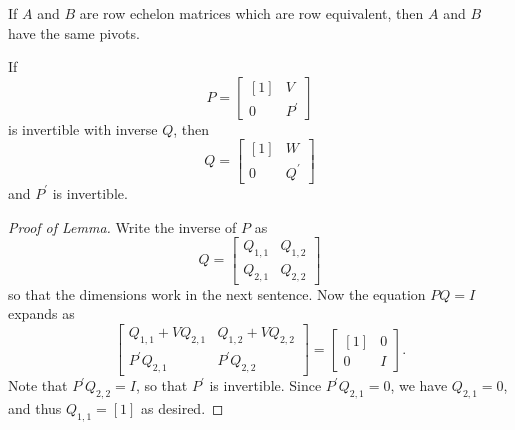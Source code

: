 \documentclass{memoir}
\begin{document}
\setcounter{section}{10}
\setcounter{dfn}{5}

\begin{prp}
If $A$ and $B$ are row echelon matrices which are row equivalent, then $A$ and $B$ have the same pivots.
\end{prp}

\begin{lem}
If \[ P = \left[ \begin{array}{c|c} [1] & V \\ \hline 0 & P^\prime \end{array} \right] \] is invertible with inverse $Q$, then \[Q = \left[ \begin{array}{c|c} [1] & W \\ \hline 0 & Q^\prime \end{array} \right] \] and $P^\prime$ is invertible.
\end{lem}

\begin{proof}[Proof of Lemma]
Write the inverse of $P$ as \[ Q = \left[ \begin{array}{c|c} Q_{1,1} & Q_{1,2} \\ \hline Q_{2,1} & Q_{2,2} \end{array} \right] \] so that the dimensions work in the next sentence. Now the equation $PQ = I$ expands as \[ \left[ \begin{array}{c|c} Q_{1,1} + VQ_{2,1} & Q_{1,2} + VQ_{2,2} \\ \hline P^\prime Q_{2,1} & P^\prime Q_{2,2} \end{array} \right] = \left[ \begin{array}{c|c} [1] & 0 \\ \hline 0 & I \end{array} \right]. \] Note that $P^\prime Q_{2,2} = I$, so that $P^\prime$ is invertible. Since $P^\prime Q_{2,1} = 0$, we have $Q_{2,1} = 0$, and thus $Q_{1,1} = [1]$ as desired.
\end{proof}
\end{document}
